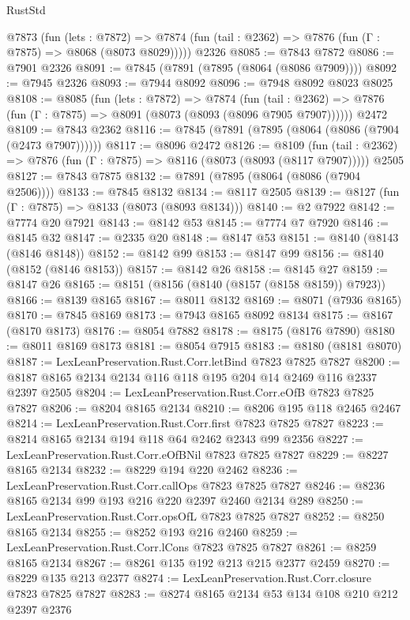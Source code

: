 \begin{lexlean}{RustStd}
\begin{coremodule}
    @7873
      (fun (lets : @7872) =>
      @7874 (fun (tail : @2362) => @7876 (fun (Γ : @7875) => @8068 (@8073 @8029)))))
    @2326
@8085 := @7843 @7872
@8086 := @7901 @2326
@8091 := @7845 (@7891 (@7895 (@8064 (@8086 @7909))))
@8092 := @7945 @2326
@8093 := @7944 @8092
@8096 := @7948 @8092 @8023 @8025
@8108 := @8085
    (fun (lets : @7872) =>
    @7874
      (fun (tail : @2362) => @7876 (fun (Γ : @7875) => @8091 (@8073 (@8093 (@8096 @7905 @7907))))))
    @2472
@8109 := @7843 @2362
@8116 := @7845 (@7891 (@7895 (@8064 (@8086 (@7904 (@2473 @7907))))))
@8117 := @8096 @2472
@8126 := @8109
    (fun (tail : @2362) => @7876 (fun (Γ : @7875) => @8116 (@8073 (@8093 (@8117 @7907)))))
    @2505
@8127 := @7843 @7875
@8132 := @7891 (@7895 (@8064 (@8086 (@7904 @2506))))
@8133 := @7845 @8132
@8134 := @8117 @2505
@8139 := @8127 (fun (Γ : @7875) => @8133 (@8073 (@8093 @8134)))
@8140 := @2 @7922
@8142 := @7774 @20 @7921
@8143 := @8142 @53
@8145 := @7774 @7 @7920
@8146 := @8145 @32
@8147 := @2335 @20
@8148 := @8147 @53
@8151 := @8140 (@8143 (@8146 @8148))
@8152 := @8142 @99
@8153 := @8147 @99
@8156 := @8140 (@8152 (@8146 @8153))
@8157 := @8142 @26
@8158 := @8145 @27
@8159 := @8147 @26
@8165 := @8151 (@8156 (@8140 (@8157 (@8158 @8159)) @7923))
@8166 := @8139 @8165
@8167 := @8011 @8132
@8169 := @8071 (@7936 @8165)
@8170 := @7845 @8169
@8173 := @7943 @8165 @8092 @8134
@8175 := @8167 (@8170 @8173)
@8176 := @8054 @7882
@8178 := @8175 (@8176 @7890)
@8180 := @8011 @8169 @8173
@8181 := @8054 @7915
@8183 := @8180 (@8181 @8070)
@8187 := LexLeanPreservation.Rust.Corr.letBind @7823 @7825 @7827
@8200 := @8187 @8165 @2134 @2134 @116 @118 @195 @204 @14 @2469 @116 @2337 @2397 @2505
@8204 := LexLeanPreservation.Rust.Corr.eOfB @7823 @7825 @7827
@8206 := @8204 @8165 @2134
@8210 := @8206 @195 @118 @2465 @2467
@8214 := LexLeanPreservation.Rust.Corr.first @7823 @7825 @7827
@8223 := @8214 @8165 @2134 @194 @118 @64 @2462 @2343 @99 @2356
@8227 := LexLeanPreservation.Rust.Corr.eOfBNil @7823 @7825 @7827
@8229 := @8227 @8165 @2134
@8232 := @8229 @194 @220 @2462
@8236 := LexLeanPreservation.Rust.Corr.callOps @7823 @7825 @7827
@8246 := @8236 @8165 @2134 @99 @193 @216 @220 @2397 @2460 @2134 @289
@8250 := LexLeanPreservation.Rust.Corr.opsOfL @7823 @7825 @7827
@8252 := @8250 @8165 @2134
@8255 := @8252 @193 @216 @2460
@8259 := LexLeanPreservation.Rust.Corr.lCons @7823 @7825 @7827
@8261 := @8259 @8165 @2134
@8267 := @8261 @135 @192 @213 @215 @2377 @2459
@8270 := @8229 @135 @213 @2377
@8274 := LexLeanPreservation.Rust.Corr.closure @7823 @7825 @7827
@8283 := @8274 @8165 @2134 @53 @134 @108 @210 @212 @2397 @2376

\end{coremodule}
\end{lexlean}
